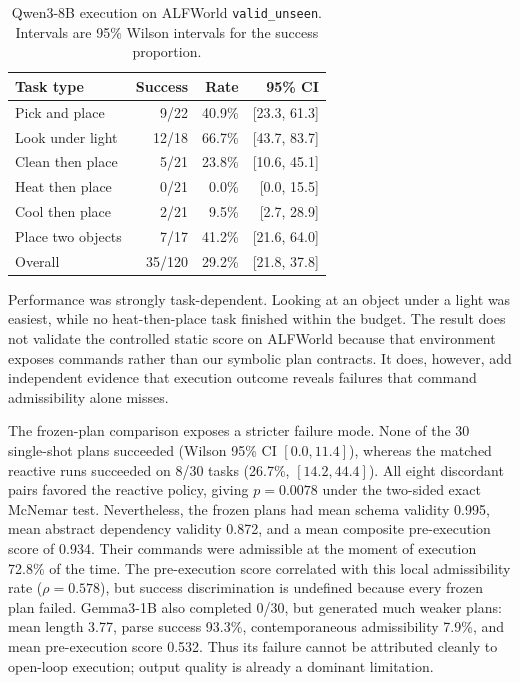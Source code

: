 \documentclass[10pt]{article}
\begin{document}
\begin{table}[t]
\centering
\caption{Qwen3-8B execution on ALFWorld \texttt{valid\_unseen}. Intervals are
95\% Wilson intervals for the success proportion.}
\label{tab:alfworld}
\begin{tabular}{lrrr}
\toprule
Task type & Success & Rate & 95\% CI \\
\midrule
Pick and place & 9/22 & 40.9\% & [23.3, 61.3] \\
Look under light & 12/18 & 66.7\% & [43.7, 83.7] \\
Clean then place & 5/21 & 23.8\% & [10.6, 45.1] \\
Heat then place & 0/21 & 0.0\% & [0.0, 15.5] \\
Cool then place & 2/21 & 9.5\% & [2.7, 28.9] \\
Place two objects & 7/17 & 41.2\% & [21.6, 64.0] \\
\midrule
Overall & 35/120 & 29.2\% & [21.8, 37.8] \\
\bottomrule
\end{tabular}
\end{table}

Performance was strongly task-dependent. Looking at an object under a light
was easiest, while no heat-then-place task finished within the budget. The
result does not validate the controlled static score on ALFWorld because that
environment exposes commands rather than our symbolic plan contracts. It does,
however, add independent evidence that execution outcome reveals failures that
command admissibility alone misses.

The frozen-plan comparison exposes a stricter failure mode. None of the 30
single-shot plans succeeded (Wilson 95\% CI $[0.0,11.4]$), whereas the matched
reactive runs succeeded on 8/30 tasks (26.7\%, $[14.2,44.4]$). All eight
discordant pairs favored the reactive policy, giving $p=0.0078$ under the
two-sided exact McNemar test. Nevertheless, the frozen plans had mean schema
validity 0.995, mean abstract dependency validity 0.872, and a mean composite
pre-execution score of 0.934. Their commands were admissible at the moment of
execution 72.8\% of the time. The pre-execution score correlated with this
local admissibility rate ($\rho=0.578$), but success discrimination is undefined
because every frozen plan failed.
Gemma3-1B also completed 0/30, but generated much weaker plans: mean length
3.77, parse success 93.3\%, contemporaneous admissibility 7.9\%, and mean
pre-execution score 0.532. Thus its failure cannot be attributed cleanly to
open-loop execution; output quality is already a dominant limitation.
\end{document}
